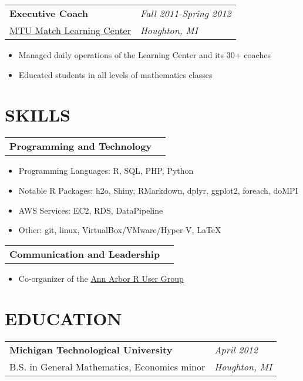 \documentclass[margin,line]{res}
\begin{document}
\begin{resume}
\begin{tabular}{p{4.4in} l}
  {\bf Executive Coach} &  \emph{Fall 2011-Spring 2012}\\
  \href{http://www.mathlab.mtu.edu/mlc/index.php/Main_Page}{MTU Match Learning Center} & \emph{Houghton, MI}
\end{tabular}
\vspace{1pt}
\begin{itemize}\itemsep -2pt %
  \item Managed daily operations of the Learning Center and its 30+ coaches
  \item Educated students in all levels of mathematics classes
\end{itemize}

\vspace{3pt}


\section{SKILLS}

\begin{tabular}{p{4.4in} l}
  {\bf Programming and Technology}
\end{tabular}
\vspace{2pt}
\begin{itemize} \itemsep -2pt
  \item Programming Languages: R, SQL, PHP, Python
  \item Notable R Packages: h2o, Shiny, RMarkdown, dplyr, ggplot2, foreach, doMPI
  \item AWS Services: EC2, RDS, DataPipeline
  \item Other: git, linux, VirtualBox/VMware/Hyper-V, \LaTeX
\end{itemize}

\begin{tabular}{p{4.4in} l}
  {\bf Communication and Leadership}
\end{tabular}
\vspace{2pt}
\begin{itemize} \itemsep -2pt
  \item Co-organizer of the \href{https://annarborrusergroup.github.io/}{Ann Arbor R User Group}
\end{itemize}

\vspace{3pt}


\section{EDUCATION}

\begin{tabular}{p{4.4in} l}
  {\bf Michigan Technological University} & \emph{April 2012} \\
  B.S. in General Mathematics, Economics minor & \emph{Houghton, MI} \\
\end{tabular}


\end{resume}
\end{document}
